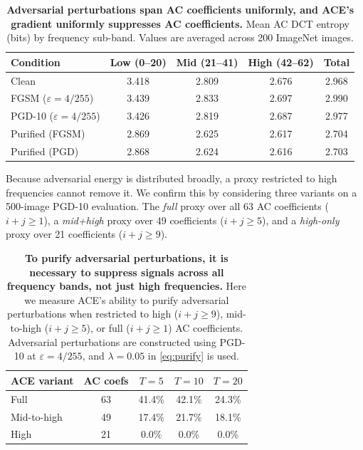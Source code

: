 \documentclass{article}
\theoremstyle{definition}
\begin{document}
\begin{table}[ht]
  \centering
  \small
  \caption{
  \textbf{Adversarial perturbations span AC coefficients uniformly, and ACE's gradient uniformly suppresses AC coefficients.}
  Mean AC DCT entropy (bits) by frequency sub-band.
  Values are averaged across 200 ImageNet images.
  }
  \label{tab:freq}
  \begin{tabular}{lcccc}
    \toprule
    Condition & Low (0--20) & Mid (21--41) & High (42--62) & Total \\
    \midrule
    Clean              & 3.418 & 2.809 & 2.676 & 2.968 \\
    FGSM ($\varepsilon=4/255$)   & 3.439 & 2.833 & 2.697 & 2.990 \\
    PGD-10 ($\varepsilon=4/255$) & 3.426 & 2.819 & 2.687 & 2.977 \\
    Purified (FGSM)    & 2.869 & 2.625 & 2.617 & 2.704 \\
    Purified (PGD)     & 2.868 & 2.624 & 2.616 & 2.703 \\
    \bottomrule
  \end{tabular}
\end{table}

Because adversarial energy is distributed broadly, a proxy restricted to high frequencies cannot remove it.
We confirm this by considering three variants on a 500-image PGD-10 evaluation.
The \emph{full} proxy over all 63 AC coefficients ($i{+}j\ge1$), a \emph{mid+high} proxy over 49 coefficients ($i{+}j\ge5$), and a \emph{high-only} proxy over 21 coefficients ($i{+}j\ge9$).

\begin{table}[ht]
  \centering
  \caption{
  \textbf{To purify adversarial perturbations, it is necessary to suppress signals across all frequency bands, not just high frequencies.}
  Here we measure ACE's ability to purify adversarial perturbations when restricted to high ($i+j\geq9$), mid-to-high ($i+j\geq5$), or full ($i+j\geq1$) AC coefficients.
  Adversarial perturbations are constructed using PGD-10 at $\varepsilon=4/255$, and $\lambda=0.05$ in \eqref{eq:purify} is used.
  }
  \label{tab:freq_ablation}
  \begin{tabular}{lcccc}
    \toprule
    ACE variant & AC coefs & $T=5$ & $T=10$ & $T=20$ \\
    \midrule
    Full & 63 & 41.4\% & 42.1\% & 24.3\% \\
    Mid-to-high & 49 & 17.4\% &  21.7\% & 18.1\% \\
    High & 21 & 0.0\% & 0.0\% &  0.0\% \\
    \bottomrule
  \end{tabular}
\end{table}
\end{document}
